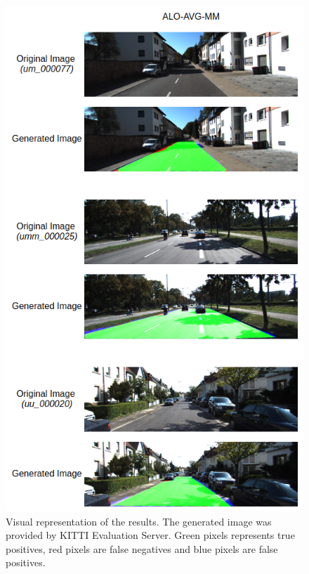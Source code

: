 \begin{figure}
  \centering
  \includegraphics[width=1.\columnwidth]{figures/falreis/visual_representation.png}
  \caption{Visual representation of the results. The generated image was provided by KITTI Evaluation Server. Green pixels represents true positives, red pixels are false negatives and blue pixels are false positives.}
  \label{fig:visual_representation}
\end{figure}